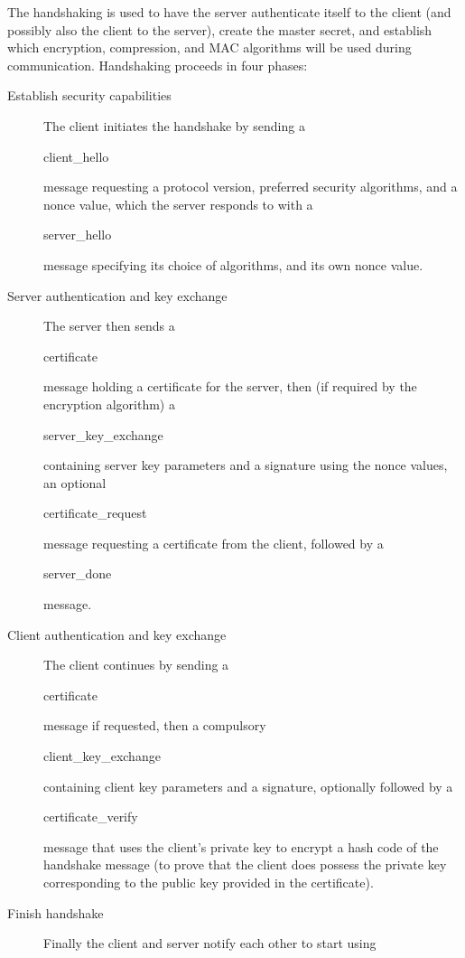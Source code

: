 The handshaking is used to have the server authenticate itself to
the client (and possibly also the client to the server), create the master secret,
and establish which encryption, compression, and MAC algorithms will be used during
communication.
Handshaking proceeds in four phases:
\begin{description}
  \item[Establish security capabilities]
  The client initiates the handshake by sending a \begin{code}client\_hello\end{code}
  message requesting a protocol version, preferred security algorithms, and a nonce value,
  which the server responds to with a \begin{code}server\_hello\end{code}
  message specifying its choice of algorithms, and its own nonce value.
  \item[Server authentication and key exchange]
  The server then sends a \begin{code}certi\-ficate\end{code} message holding a
  certificate for the server, then (if required by the encryption algorithm) a
  \begin{code}server\_key\_exchange\end{code}
  containing server key parameters and a signature
  using the nonce values, an optional \begin{code}certifi\-cate\_request\end{code}
  message requesting a certificate from the client, followed by a
  \begin{code}server\_done\end{code} message.
  \item[Client authentication and key exchange]
  The client continues by sending a \begin{code}certificate\end{code} message if requested,
  then a compulsory \begin{code}client\_key\_exch\-ange\end{code} containing client key parameters
  and a signature, optionally followed by a \begin{code}certificate\_verify\end{code}
  message that uses the client's private key to encrypt a hash code of the handshake message
  (to prove that the client does possess the private key corresponding to the public key
  provided in the certificate).
  \item[Finish handshake] Finally the client and server notify each other to start using

\end{description}

